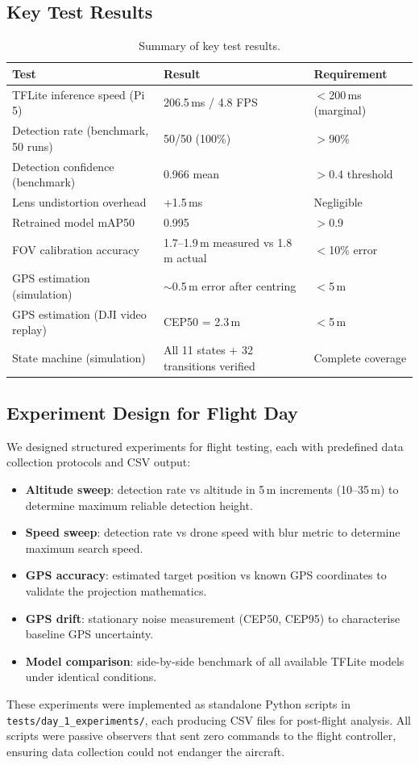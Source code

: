 \subsection{Key Test Results}

\begin{table}[htbp]
\centering
\compactTable
\caption{Summary of key test results.}
\label{tab:test_results}
\begin{tabularx}{\linewidth}{X l l}
\toprule
\textbf{Test} & \textbf{Result} & \textbf{Requirement} \\
\midrule
TFLite inference speed (Pi 5) & 206.5\,ms / 4.8 FPS & $<$200\,ms (marginal) \\
Detection rate (benchmark, 50 runs) & 50/50 (100\%) & $>$90\% \\
Detection confidence (benchmark) & 0.966 mean & $>$0.4 threshold \\
Lens undistortion overhead & +1.5\,ms & Negligible \\
Retrained model mAP50 & 0.995 & $>$0.9 \\
FOV calibration accuracy & 1.7--1.9\,m measured vs 1.8\,m actual & $<$10\% error \\
GPS estimation (simulation) & $\sim$0.5\,m error after centring & $<$5\,m \\
GPS estimation (DJI video replay) & CEP50 = 2.3\,m & $<$5\,m \\
State machine (simulation) & All 11 states + 32 transitions verified & Complete coverage \\
\bottomrule
\end{tabularx}
\end{table}

\subsection{Experiment Design for Flight Day}

We designed structured experiments for flight testing, each with predefined data collection protocols and CSV output:

\begin{itemize}
  \item \textbf{Altitude sweep}: detection rate vs altitude in 5\,m increments (10--35\,m) to determine maximum reliable detection height.
  \item \textbf{Speed sweep}: detection rate vs drone speed with blur metric to determine maximum search speed.
  \item \textbf{GPS accuracy}: estimated target position vs known GPS coordinates to validate the projection mathematics.
  \item \textbf{GPS drift}: stationary noise measurement (CEP50, CEP95) to characterise baseline GPS uncertainty.
  \item \textbf{Model comparison}: side-by-side benchmark of all available TFLite models under identical conditions.
\end{itemize}

These experiments were implemented as standalone Python scripts in \texttt{tests/day\_1\_experiments/}, each producing CSV files for post-flight analysis. All scripts were passive observers that sent zero commands to the flight controller, ensuring data collection could not endanger the aircraft.

